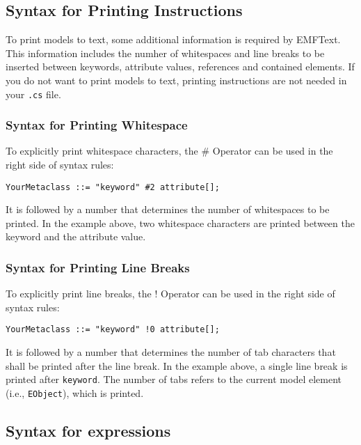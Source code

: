 \subsection{Syntax for Printing Instructions}

To print models to text, some additional information is required by EMFText. 
This information includes the numher of whitespaces and line breaks to be 
inserted between keywords, attribute values, references and contained elements. 
If you do not want to print models to text, printing instructions are not needed 
in your \texttt{.cs} file.

\subsubsection{Syntax for Printing Whitespace}

To explicitly print whitespace characters, the \# Operator can be used in the
right side of syntax rules:

\begin{lstlisting}
YourMetaclass ::= "keyword" #2 attribute[];
\end{lstlisting}

It is followed by a number that determines the number of whitespaces to be
printed. In the example above, two whitespace characters are printed between the
keyword and the attribute value.

\subsubsection{Syntax for Printing Line Breaks}

To explicitly print line breaks, the ! Operator can be used in the
right side of syntax rules:

\begin{lstlisting}
YourMetaclass ::= "keyword" !0 attribute[];
\end{lstlisting}

It is followed by a number that determines the number of tab characters that
shall be printed after the line break. In the example above, a single line break
is printed after \texttt{keyword}. The number of tabs refers to the current
model element (i.e., \texttt{EObject}), which is printed.

\subsection{Syntax for expressions}

